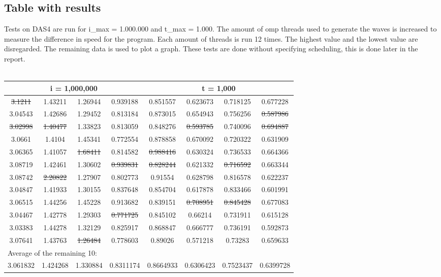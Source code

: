\documentclass[a4paper]{article}
\begin{document}
  \subsection{Table with results}
    Tests on DAS4 are run for i\_max = 1.000.000 and t\_max = 1.000.
    The amount of omp threads used to generate the waves is increased
    to measure the difference in speed for the program.
    Each amount of threads is run 12 times. 
    The highest value and the lowest value are disregarded. 
    The remaining data is used to plot a graph.
    These tests are done without specifying scheduling,
    this is done later in the report.\\\\
    \begin{tabular}{| c | c | c | c | c | c | c | c |}
      \hline
      \multicolumn{4}{|c}{i = 1,000,000} & \multicolumn{4}{c|}{t = 1,000}\\
      \hline
\st{3.1211} & 1.43211 & 1.26944 & 0.939188 & 0.851557 & 0.623673 & 0.718125 & 0.677228\\
      \hline
3.04543 & 1.42686 & 1.29452 & 0.813184 & 0.873015 & 0.654943 & 0.756256 & \st{0.587986}\\
      \hline
\st{3.02998} & \st{1.40477} & 1.33823 & 0.813059 & 0.848276 & \st{0.593785} & 0.740096 & \st{0.694887}\\
      \hline
3.0661 & 1.4104 & 1.45341 & 0.772554 & 0.878858 & 0.670092 & 0.720322 & 0.631909\\
      \hline
3.06365 & 1.41057 & \st{1.68411} & 0.814582 & \st{0.988416} & 0.630324 & 0.736533 & 0.664366\\
      \hline
3.08719 & 1.42461 & 1.30602 & \st{0.939831} & \st{0.828244} & 0.621332 & \st{0.716592} & 0.663344\\
      \hline
3.08742 & \st{2.20822} & 1.27907 & 0.802773 & 0.91554 & 0.628798 & 0.816578 & 0.622237\\
      \hline
3.04847 & 1.41933 & 1.30155 & 0.837648 & 0.854704 & 0.617878 & 0.833466 & 0.601991\\
      \hline
3.06515 & 1.44256 & 1.45228 & 0.913682 & 0.839151 & \st{0.708951} & \st{0.845428} & 0.677083\\
      \hline
3.04467 & 1.42778 & 1.29303 & \st{0.771725} & 0.845102 & 0.66214 & 0.731911 & 0.615128\\
      \hline
3.03383 & 1.44278 & 1.32129 & 0.825917 & 0.868847 & 0.666777 & 0.736191 & 0.592873\\
      \hline
3.07641 & 1.43763 & \st{1.26484} & 0.778603 & 0.89026 & 0.571218 & 0.73283 & 0.659633\\
      \hline
      \multicolumn{8}{|l|}{Average of the remaining 10:}\\
      \hline
      3.061832 & 1.424268 & 1.330884 & 0.8311174 & 0.8664933 & 0.6306423 & 0.7523437 & 0.6399728\\
      \hline
    \end{tabular}
\end{document}
